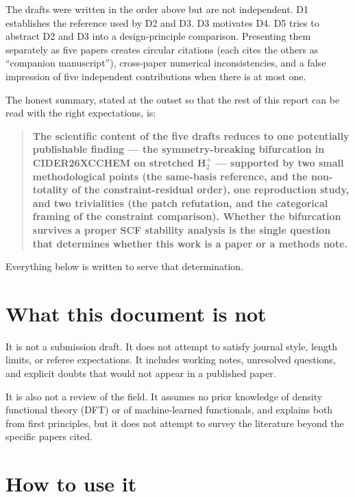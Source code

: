 \documentclass[11pt]{report}
\theoremstyle{definition}
\theoremstyle{remark}
\begin{document}
The drafts were written in the order above but are not independent. D1
establishes the reference used by D2 and D3. D3 motivates D4. D5 tries to
abstract D2 and D3 into a design-principle comparison. Presenting them
separately as five papers creates circular citations (each cites the others
as ``companion manuscript''), cross-paper numerical inconsistencies, and a
false impression of five independent contributions when there is at most
one.

The honest summary, stated at the outset so that the rest of this report can
be read with the right expectations, is:

\begin{quote}
\textbf{The scientific content of the five drafts reduces to one
potentially publishable finding --- the symmetry-breaking bifurcation in
CIDER26XCCHEM on stretched H$_2^+$ --- supported by two small methodological
points (the same-basis reference, and the non-totality of the
constraint-residual order), one reproduction study, and two trivialities
(the patch refutation, and the categorical framing of the constraint
comparison). Whether the bifurcation survives a proper SCF stability
analysis is the single question that determines whether this work is a
paper or a methods note.}
\end{quote}

Everything below is written to serve that determination.

\section{What this document is not}

It is not a submission draft. It does not attempt to satisfy journal style,
length limits, or referee expectations. It includes working notes,
unresolved questions, and explicit doubts that would not appear in a
published paper.

It is also not a review of the field. It assumes no prior knowledge of
density functional theory (DFT) or of machine-learned functionals, and
explains both from first principles, but it does not attempt to survey the
literature beyond the specific papers cited.

\section{How to use it}
\end{document}
